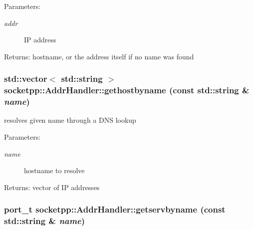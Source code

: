 \begin{Desc}
\item[Parameters:]
\begin{description}
\item[{\em addr}]IP address \end{description}
\end{Desc}
\begin{Desc}
\item[Returns:]hostname, or the address itself if no name was found \end{Desc}
\hypertarget{classsocketpp_1_1AddrHandler_d840f7fee97d701511f09459bef35748}{
\subsubsection[{gethostbyname}]{\setlength{\rightskip}{0pt plus 5cm}std::vector$<$ std::string $>$ socketpp::AddrHandler::gethostbyname (const std::string \& {\em name})}}
\label{classsocketpp_1_1AddrHandler_d840f7fee97d701511f09459bef35748}


resolves given name through a DNS lookup 

\begin{Desc}
\item[Parameters:]
\begin{description}
\item[{\em name}]hostname to resolve \end{description}
\end{Desc}
\begin{Desc}
\item[Returns:]vector of IP addresses \end{Desc}
\hypertarget{classsocketpp_1_1AddrHandler_aa24239225e2a35cce9322dfa68bf438}{
\subsubsection[{getservbyname}]{\setlength{\rightskip}{0pt plus 5cm}port\_\-t socketpp::AddrHandler::getservbyname (const std::string \& {\em name})}}
\label{classsocketpp_1_1AddrHandler_aa24239225e2a35cce9322dfa68bf438}


